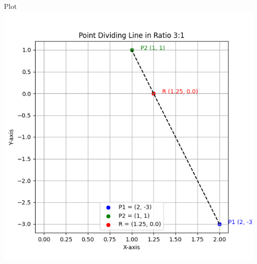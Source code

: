 \documentclass{beamer}
\begin{document}
\begin{frame}{Plot}
\centering
\includegraphics[height=0.7\textheight, keepaspectratio]{figs/q1.png}
\end{frame}
\end{document}
